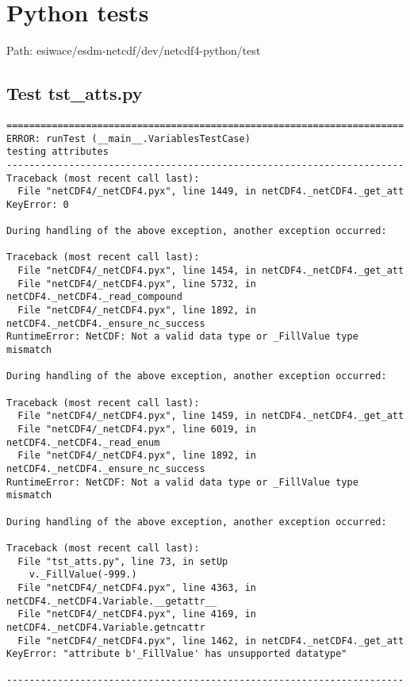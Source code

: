 \chapter{Python tests}

Path: esiwace/esdm-netcdf/dev/netcdf4-python/test

\section{Test tst\_atts.py}

\begin{verbatim}
======================================================================
ERROR: runTest (__main__.VariablesTestCase)
testing attributes
----------------------------------------------------------------------
Traceback (most recent call last):
  File "netCDF4/_netCDF4.pyx", line 1449, in netCDF4._netCDF4._get_att
KeyError: 0

During handling of the above exception, another exception occurred:

Traceback (most recent call last):
  File "netCDF4/_netCDF4.pyx", line 1454, in netCDF4._netCDF4._get_att
  File "netCDF4/_netCDF4.pyx", line 5732, in netCDF4._netCDF4._read_compound
  File "netCDF4/_netCDF4.pyx", line 1892, in netCDF4._netCDF4._ensure_nc_success
RuntimeError: NetCDF: Not a valid data type or _FillValue type mismatch

During handling of the above exception, another exception occurred:

Traceback (most recent call last):
  File "netCDF4/_netCDF4.pyx", line 1459, in netCDF4._netCDF4._get_att
  File "netCDF4/_netCDF4.pyx", line 6019, in netCDF4._netCDF4._read_enum
  File "netCDF4/_netCDF4.pyx", line 1892, in netCDF4._netCDF4._ensure_nc_success
RuntimeError: NetCDF: Not a valid data type or _FillValue type mismatch

During handling of the above exception, another exception occurred:

Traceback (most recent call last):
  File "tst_atts.py", line 73, in setUp
    v._FillValue(-999.)
  File "netCDF4/_netCDF4.pyx", line 4363, in netCDF4._netCDF4.Variable.__getattr__
  File "netCDF4/_netCDF4.pyx", line 4169, in netCDF4._netCDF4.Variable.getncattr
  File "netCDF4/_netCDF4.pyx", line 1462, in netCDF4._netCDF4._get_att
KeyError: "attribute b'_FillValue' has unsupported datatype"

----------------------------------------------------------------------
\end{verbatim}

